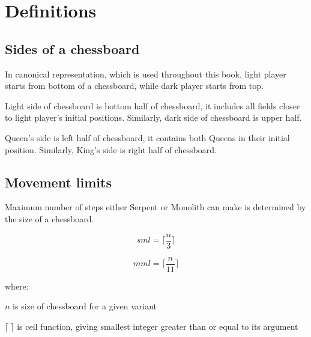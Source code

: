 

\chapter*{Definitions}
\label{ch:Definitions}

\section*{Sides of a chessboard}
\label{sec:Definitions/Sides of a chessboard}

In canonical representation, which is used throughout this book, light player
starts from bottom of a chessboard, while dark player starts from top.

Light side of chessboard is bottom half of chessboard, it includes all fields
closer to light player's initial positions. Similarly, dark side of chessboard
is upper half.

Queen's side is left half of chessboard, it contains both Queens in their initial
position. Similarly, King's side is right half of chessboard.

\clearpage %

\section*{Movement limits}
\label{sec:Definitions/Movement limits}

Maximum number of steps either Serpent or Monolith can make is determined by the size
of a chessboard.

\begin{equation}
sml = \lceil \frac{n}{3} \rceil
\end{equation}

\begin{equation}
mml = \lceil \frac{n}{11} \rceil
\end{equation}

where:

$n$ is size of chessboard for a given variant

$\lceil\ \rceil$ is ceil function, giving smallest integer greater than or equal to its argument

